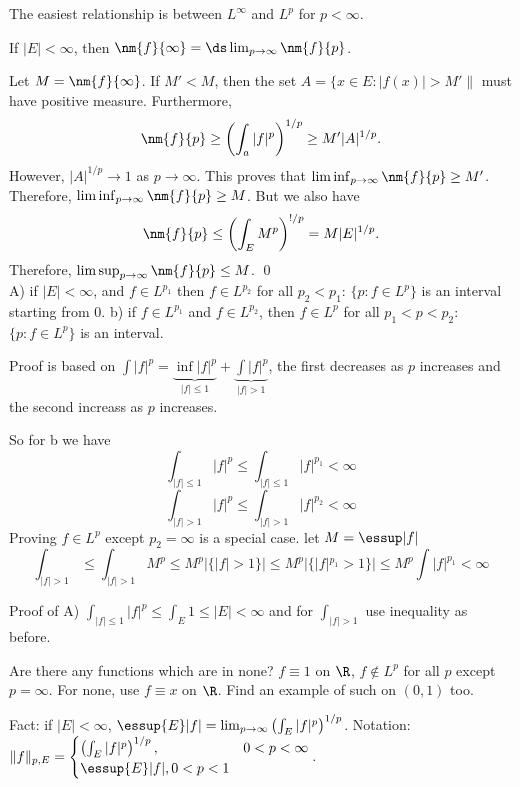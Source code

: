 The easiest relationship is between $L^\infty$ and $L^p$ for $p<\infty$.


\begin{prop}
If $|E|<\infty$, then $\nm{f}{\infty}= \ds\lim_{p \to \infty} \nm{f}{p}$. 
\end{prop}

\pf Let $M= \nm{f}{\infty}$. If $M' < M$, then the set $A= \{ x \in E \colon |f(x)|>M'\|$ must have positive measure. Furthermore,
	\[
	\nm{f}{p} \geq \left( \int_a |f|^p \right)^{1/p} \geq M' |A|^{1/p}.
	\]
However, $|A|^{1/p} \to 1$ as $p \to \infty$. This proves that $\liminf_{p \to \infty} \nm{f}{p} \geq M'$. Therefore, $\liminf_{p \to \infty} \nm{f}{p} \geq M$. But we also have
	\[
	\nm{f}{p} \leq \left( \int_E M^p \right)^{!/p}= M |E|^{1/p}.
	\]
Therefore, $\limsup_{p \to \infty} \nm{f}{p} \leq M$. \qed \\








A) if $|E|<\infty$, and $f \in L^{p_1}$ then $f \in L^{p_2}$ for all $p_2<p_1$: $\{p \colon f \in L^p\}$ is an interval starting from 0.
b) if $f \in L^{p_1}$ and $f \in L^{p_2}$, then $f \in L^p$ for all $p_1<p<p_2$: $\{p \colon f\in L^p\}$ is an interval.


Proof is based on $\int |f|^p= \underbrace{\inf |f|^p}_{|f| \leq 1} + \underbrace{\int |f|^p}_{|f|>1}$, the first decreases as $p$ increases and the second increass as $p$ increases.

So for b we have
	\[
	\int_{|f| \leq 1} |f|^p \leq \int_{|f| \leq 1} |f|^{p_1} < \infty
	\]
	\[
	\int_{|f|>1} |f|^p \leq \int_{|f|>1} |f|^{p_2} < \infty
	\]
Proving $f \in L^p$ except $p_2=\infty$ is a special case. let $M= \essup |f|$ 
	\[
	\int_{|f|>1} \leq \int_{|f|>1} M^p \leq M^p |\{|f|>1\}| \leq M^p |\{|f|^{p_1}>1\}| \leq M^p \int |f|^{p_1} < \infty
	\]


Proof of A) $\int_{|f| \leq 1} |f|^p \leq \int_E 1 \leq |E|<\infty$ and for $\int_{|f|>1}$ use inequality as before. 




Are there any functions which are in none? $f \equiv 1$ on $\R$, $f \notin L^p$ for all $p$ except $p=\infty$. For none, use $f \equiv x$ on $\R$. Find an example of such on $(0,1)$ too. 




Fact: if $|E|<\infty$, $\essup{E} |f|= \lim_{p \to \infty} \left( \int_E |f|^p\right)^{1/p}$. Notation: $\|f\|_{p,E}= \begin{cases} \left( \int_E |f|^p\right)^{1/p}, & 0<p<\infty \\ \essup{E} |f|, 0<p<1 \end{cases}$. 




